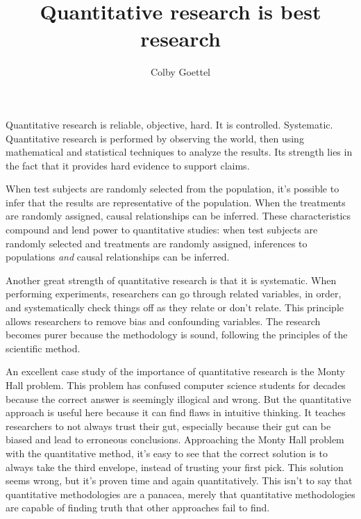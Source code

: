 \documentclass[12pt]{article}
\title{Quantitative research is best research}
\author{Colby Goettel}
\begin{document}
\maketitle


Quantitative research is reliable, objective, hard. It is controlled. Systematic. Quantitative research is performed by observing the world, then using mathematical and statistical techniques to analyze the results. Its strength lies in the fact that it provides hard evidence to support claims.

When test subjects are randomly selected from the population, it's possible to infer that the results are representative of the population. When the treatments are randomly assigned, causal relationships can be inferred. These characteristics compound and lend power to quantitative studies: when test subjects are randomly selected and treatments are randomly assigned, inferences to populations \emph{and} causal relationships can be inferred.

Another great strength of quantitative research is that it is systematic. When performing experiments, researchers can go through related variables, in order, and systematically check things off as they relate or don't relate. This principle allows researchers to remove bias and confounding variables. The research becomes purer because the methodology is sound, following the principles of the scientific method.

An excellent case study of the importance of quantitative research is the Monty Hall problem. This problem has confused computer science students for decades because the correct answer is seemingly illogical and wrong. But the quantitative approach is useful here because it can find flaws in intuitive thinking. It teaches researchers to not always trust their gut, especially because their gut can be biased and lead to erroneous conclusions. Approaching the Monty Hall problem with the quantitative method, it's easy to see that the correct solution is to always take the third envelope, instead of trusting your first pick. This solution seems wrong, but it's proven time and again quantitatively. This isn't to say that quantitative methodologies are a panacea, merely that quantitative methodologies are capable of finding truth that other approaches fail to find.
\end{document}

